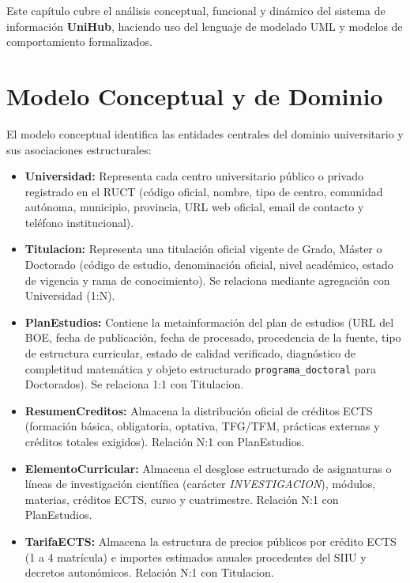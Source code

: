 Este capítulo cubre el análisis conceptual, funcional y dinámico del sistema de información \textbf{UniHub}, haciendo uso del lenguaje de modelado UML y modelos de comportamiento formalizados.

\section{Modelo Conceptual y de Dominio}
El modelo conceptual identifica las entidades centrales del dominio universitario y sus asociaciones estructurales:
\begin{itemize}
    \item \textbf{Universidad:} Representa cada centro universitario público o privado registrado en el RUCT (código oficial, nombre, tipo de centro, comunidad autónoma, municipio, provincia, URL web oficial, email de contacto y teléfono institucional).
    \item \textbf{Titulacion:} Representa una titulación oficial vigente de Grado, Máster o Doctorado (código de estudio, denominación oficial, nivel académico, estado de vigencia y rama de conocimiento). Se relaciona mediante agregación con Universidad (1:N).
    \item \textbf{PlanEstudios:} Contiene la metainformación del plan de estudios (URL del BOE, fecha de publicación, fecha de procesado, procedencia de la fuente, tipo de estructura curricular, estado de calidad verificado, diagnóstico de completitud matemática y objeto estructurado \texttt{programa\_doctoral} para Doctorados). Se relaciona 1:1 con Titulacion.
    \item \textbf{ResumenCreditos:} Almacena la distribución oficial de créditos ECTS (formación básica, obligatoria, optativa, TFG/TFM, prácticas externas y créditos totales exigidos). Relación N:1 con PlanEstudios.
    \item \textbf{ElementoCurricular:} Almacena el desglose estructurado de asignaturas o líneas de investigación científica (carácter \emph{INVESTIGACION}), módulos, materias, créditos ECTS, curso y cuatrimestre. Relación N:1 con PlanEstudios.
    \item \textbf{TarifaECTS:} Almacena la estructura de precios públicos por crédito ECTS (1\textordfeminine{} a 4\textordfeminine{} matrícula) e importes estimados anuales procedentes del SIIU y decretos autonómicos. Relación N:1 con Titulacion.
\end{itemize}


